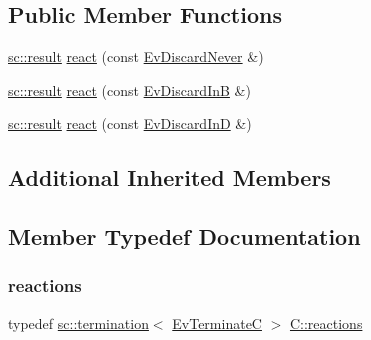 \subsection*{Public Member Functions}
\begin{DoxyCompactItemize}
\item 
\mbox{\hyperlink{namespaceboost_1_1statechart_abe807f6598b614d6d87bb951ecd92331}{sc\+::result}} \mbox{\hyperlink{struct_c_a7c66bc54e8f268346ec27933ad446d5d}{react}} (const \mbox{\hyperlink{struct_ev_discard_never}{Ev\+Discard\+Never}} \&)
\item 
\mbox{\hyperlink{namespaceboost_1_1statechart_abe807f6598b614d6d87bb951ecd92331}{sc\+::result}} \mbox{\hyperlink{struct_c_af44f3b580444ff4e97f803b18de14499}{react}} (const \mbox{\hyperlink{struct_ev_discard_in_b}{Ev\+Discard\+InB}} \&)
\item 
\mbox{\hyperlink{namespaceboost_1_1statechart_abe807f6598b614d6d87bb951ecd92331}{sc\+::result}} \mbox{\hyperlink{struct_c_ab564da3e047d017f15645aa4682ae8f3}{react}} (const \mbox{\hyperlink{struct_ev_discard_in_d}{Ev\+Discard\+InD}} \&)
\end{DoxyCompactItemize}
\subsection*{Additional Inherited Members}


\subsection{Member Typedef Documentation}
\mbox{\label{struct_c_ab8b632236e00c355feedf0213d217543}} 
\subsubsection{\texorpdfstring{reactions}{reactions}\hspace{0.1cm}{\footnotesize\ttfamily [1/2]}}
{\footnotesize\ttfamily typedef \mbox{\hyperlink{classboost_1_1statechart_1_1termination}{sc\+::termination}}$<$ \mbox{\hyperlink{struct_ev_terminate_c}{Ev\+TerminateC}} $>$ \mbox{\hyperlink{struct_c_a1891987db7cdbea5f19084087b9174fa}{C\+::reactions}}}

\mbox{\label{struct_c_a1891987db7cdbea5f19084087b9174fa}} 
